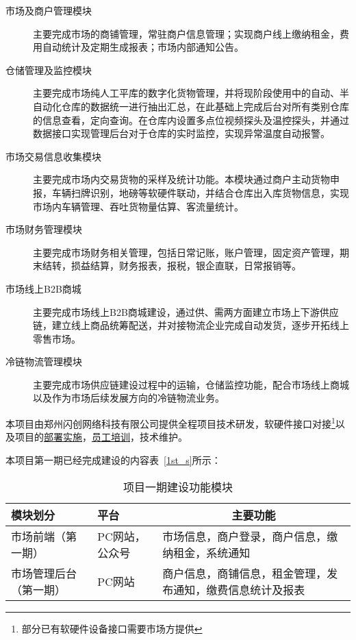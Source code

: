 \documentclass[12pt,a4paper,openany]{ctexrep}
\begin{document}
\begin{description}
\item[市场及商户管理模块]主要完成市场的商铺管理，常驻商户信息管理；实现商户线上缴纳租金，费用自动统计及定期生成报表；市场内部通知公告。\par
\item[仓储管理及监控模块]主要完成市场纯人工平库的数字化货物管理，并将现阶段使用中的自动、半自动化仓库的数据统一进行抽出汇总，在此基础上完成后台对所有类别仓库的信息查看，定向查询。在仓库内设置多点位视频探头及温控探头，并通过数据接口实现管理后台对于仓库的实时监控，实现异常温度自动报警。\par
\item[市场交易信息收集模块]主要完成市场内交易货物的采样及统计功能。本模块通过商户主动货物申报，车辆扫牌识别，地磅等软硬件联动，并结合仓库出入库货物信息，实现市场内车辆管理、吞吐货物量估算、客流量统计。
\item[市场财务管理模块]主要完成市场财务相关管理，包括日常记账，账户管理，固定资产管理，期末结转，损益结算，财务报表，报税，银企直联，日常报销等。
\item[市场线上B2B商城]主要完成市场线上B2B商城建设，通过供、需两方面建立市场上下游供应链，建立线上商品统筹配送，并对接物流企业完成自动发货，逐步开拓线上零售市场。
\item[冷链物流管理模块]主要完成市场供应链建设过程中的运输，仓储监控功能，配合市场线上商城以及作为市场后续发展方向的冷链物流业务。
\end{description}

本项目由郑州闪创网络科技有限公司提供全程项目技术研发，软硬件接口对接\footnote{部分已有软硬件设备接口需要市场方提供}以及项目的\hyperref[arrange]{部署实施}，\hyperref[arrange]{员工培训}，技术维护。

本项目第一期已经完成建设的内容表~\ref{1st_s}所示：

\begin{table}[htbp]
\begin{tabular*}{\hsize}{p{3cm}<{\centering}|p{3cm}<{\centering}|p{8cm}}
\hline
模块划分					&	平台				&	\multicolumn{1}{c}{主要功能}		\\
\hline
市场前端（第一期）		&	PC网站，公众号		&	市场信息，商户登录，商户信息，缴纳租金，系统通知		\\
\hline
市场管理后台（第一期）	&	PC网站				&	商户信息，商铺信息，租金管理，发布通知，缴费信息统计及报表		\\	
\hline
\end{tabular*}
\caption{项目一期建设功能模块}
\label{function}
\end{table}
\end{document}
